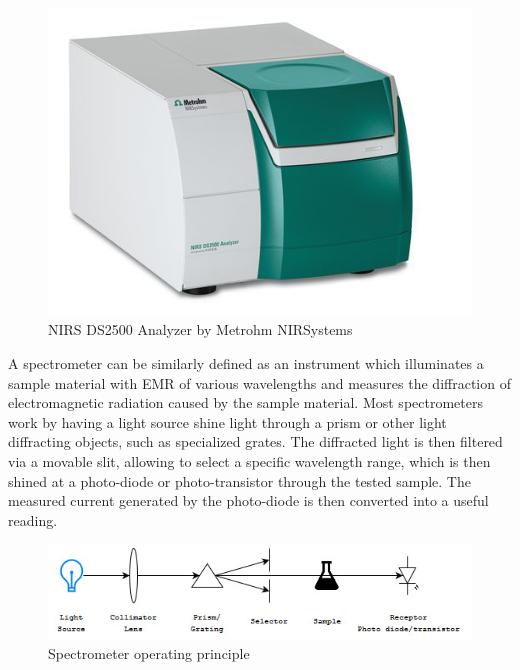 \documentclass[twoside]{ctuthesis}
\theoremstyle{plain}
\theoremstyle{definition}
\theoremstyle{note}
\begin{document}
\begin{figure}[H]
	\centering
	\includegraphics[scale = 0.75]{spectrometer}
	\caption{NIRS DS2500 Analyzer by Metrohm NIRSystems}
\end{figure}

A spectrometer can be similarly defined as an instrument which illuminates a sample material with EMR of various wavelengths and measures the diffraction of electromagnetic radiation caused by the sample material. Most spectrometers work by having a light source shine light through a prism or other light diffracting objects, such as specialized grates. The diffracted light is then filtered via a movable slit, allowing to select a specific wavelength range, which is then shined at a photo-diode or photo-transistor through the tested sample. The measured current generated by the photo-diode is then converted into a useful reading.

\begin{figure}[H]
	\centering
	\includegraphics[width = \textwidth]{spectrometer_scheme}
	\caption{Spectrometer operating principle}
\end{figure}
\end{document}
